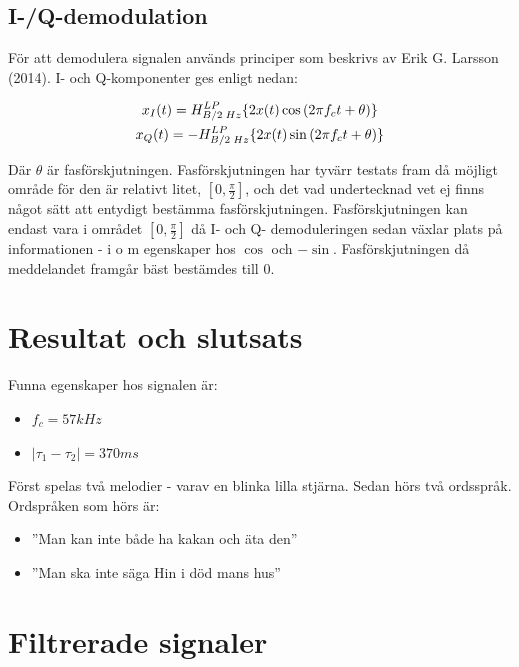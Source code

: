 \documentclass[10pt]{article}
\begin{document}
\subsection{I-/Q-demodulation}

För att demodulera signalen används principer som beskrivs av Erik G. Larsson (2014). I- och Q-komponenter ges enligt nedan: 

\begin{gather}
x_{I}(t) = \Large{H}_{B/2\;Hz}^{LP}\{2x(t)\cos{(2{\pi}f_{c}t + \theta)}\} \\
x_{Q}(t) = -\Large{H}_{B/2\;Hz}^{LP}\{2x(t)\sin{(2{\pi}f_{c}t + \theta)}\}
\label{equ:iq}
\end{gather}

Där $\theta$ är fasförskjutningen. Fasförskjutningen har tyvärr testats fram då möjligt område för den är relativt litet, $[0,\frac{\pi}{2}]$, och det vad undertecknad vet ej finns något sätt att entydigt bestämma fasförskjutningen. Fasförskjutningen kan endast vara i området $[0,\frac{\pi}{2}]$ då I- och Q- demoduleringen sedan växlar plats på informationen - i o m egenskaper hos $\cos$ och $-\sin$. Fasförskjutningen då meddelandet framgår bäst bestämdes till $0$.


\section{Resultat och slutsats}

Funna egenskaper hos signalen är: 

\begin{itemize}
	\item $f_c = 57kHz$
	\item $|\tau_1 - \tau_2| = 370ms$
\end{itemize}

Först spelas två melodier - varav en blinka lilla stjärna. Sedan hörs två ordsspråk. Ordspråken som hörs är: 

\begin{itemize}
	\item ''Man kan inte både ha kakan och äta den''
	\item ''Man ska inte säga Hin i död mans hus''
\end{itemize}

\appendix
\pagestyle{empty}
\section{Filtrerade signaler}
\end{document}
